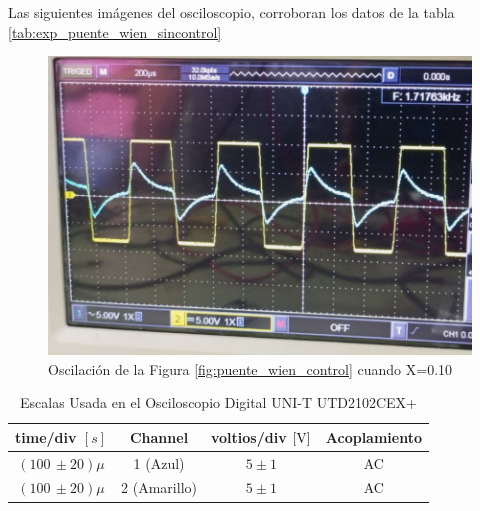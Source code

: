            Las siguientes imágenes del osciloscopio, corroboran los datos de la tabla \ref{tab:exp_puente_wien_sincontrol}
            
            \begin{figure}[H]
                \centering
                \renewcommand{\figurename}{Imagen}
                \setcounter{figure}{0}
                \includegraphics[width=15cm]{Imagenes/exp_puente_wien_sincontrol41.png}
                \caption{Oscilación de la Figura \ref{fig:puente_wien_control} cuando X=0.10}
                \label{fig:exp_puente_wien_sc41}
            \end{figure}

            \begin{table}[H]
                \centering
                \begin{tabular}{|c|c|c|c|}
                    \hline
                    \textbf{time/div} $[s]$ & \textbf{Channel} & \textbf{voltios/div $[\volt]$} & \textbf{Acoplamiento} \\ \hline
                    $(100 \, \pm 20) \mu  $ & 1 (Azul)  &   $5 \pm 1 $ & AC \\ \hline  
                    $(100 \, \pm 20) \mu  $ & 2 (Amarillo)  &   $5 \pm 1 $ & AC \\ \hline  
                \end{tabular}
                \caption{Escalas Usada en el Osciloscopio Digital UNI-T UTD2102CEX+}
                \label{tab:escala_puente_wien_sc41}
            \end{table}
            
